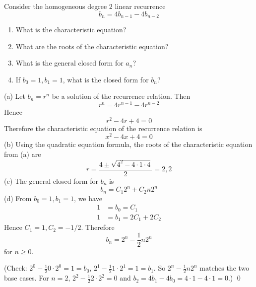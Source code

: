 \begin{ex}
  Consider the homogeneous degree 2 linear recurrence
  \[
  b_n = 4b_{n-1} - 4b_{n-2}
  \]
  \begin{enumerate}[nosep,label=(\alph*)]
  \item What is the characteristic equation?
  \item What are the roots of the characteristic equation?
  \item What is the general closed form for $a_n$?
  \item If $b_0 = 1, b_1 = 1$, what is the closed form for $b_n$?
  \end{enumerate}
\end{ex}
\SOLUTION
(a) Let $b_n = r^n$ be a solution of the recurrence relation.
Then
\[
r^n = 4 r^{n-1} - 4 r^{n-2}
\]
Hence
\[
r^2 - 4 r + 4 = 0
\]
Therefore the characteristic equation of the recurrence relation
is
\[
x^2 - 4x + 4 = 0
\]
(b)
Using the quadratic equation formula,
the roots of the characteristic equation from (a) are
\[
r = \frac{4 \pm \sqrt{4^2 - 4 \cdot 1 \cdot 4}}{2} = 2, 2
\]
(c)
The general closed form for $b_n$ is
\[
b_n = C_1 2^n + C_2 n2^n
\]
(d) From $b_0 = 1, b_1 = 1$, we have
\begin{align*}
  1 &= b_0 = C_1 \\
  1 &= b_1 = 2C_1 + 2C_2 
\end{align*}
Hence $C_1 = 1, C_2 = -1/2$.
Therefore
\[
b_n = 2^n - \frac{1}{2} n2^n
\]
for $n \geq 0$.

(Check:
$2^0 - \displaystyle\frac{1}{2} 0\cdot 2^0  = 1 = b_0$,
$2^1 - \displaystyle\frac{1}{2} 1\cdot 2^1 = 1 = b_1$.
So $2^n - \displaystyle\frac{1}{2} n2^n$ matches the
two base cases.
For $n = 2$,
$2^2 - \displaystyle\frac{1}{2}  2 \cdot 2^2 = 0$ and
$b_2 = 4b_1 - 4b_0 = 4\cdot 1 - 4\cdot 1 = 0$.)
\qed

